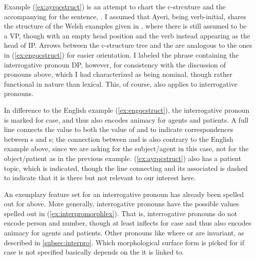 Example (\ref{ex:ayrqcstruct}) is an attempt to chart the c-strcuture and the
accompanying \Avm{} for the sentence, . I assumed that Ayeri, being
verb-initial, shares the structure of the Welsh examples given in
\textcites[66]{dalrymple2001}[130--135]{bresnan2016}, where there is still
assumed to be a VP, though with an empty head position and the verb instead
appearing as the head of IP. Arrows between the c-structure tree and the \Avm{}
are analogous to the ones in (\ref{ex:engqcstruct}) for easier orientation. I
labeled the phrase containing the interrogative pronoun DP, however, for
consistency with the discussion of pronouns above, which I had characterized
as being nominal, though rather functional in nature than lexical. This, of
course, also applies to interrogative pronouns.

In difference to the English example (\ref{ex:engqcstruct}), the interrogative
pronoun is marked for case, and thus also encodes animacy for agents and
patients. A full line connects the \Foc{} value to both the value of \Q{} and
\Subj{} to indicate correspondences between \DF{}s and \GF{}s; the connection
between \Foc{} and \Subj{} is also contrary to the English example above, since
we are asking for the subject/agent in this case, not for the object/patient as
in the previous example. (\ref{ex:ayrqcstruct}) also has a patient topic, which
is indicated, though the line connecting \Top{} and its associated \Obj{} is
dashed to indicate that it is there but not relevant to our interest here.

An exemplary feature set for an interrogative pronoun has already been spelled
out for  above. More generally, interrogative pronouns
have the possible values spelled out in (\ref{ex:interpromorphlex}). That is,
interrogative pronouns do not encode person and number, though at least 
 inflects for case and thus also encodes animacy for agents
and patients. Other pronouns like  {where} or
 are invariant, as described in
\autoref{subsec:interpro}. Which morphological surface form is picked for \Q{}
if case is not specified basically depends on the \GF{} it is linked to.

\begin{morphlex}
\ex\label{ex:interpromorphlex}
\xe
\end{morphlex}


